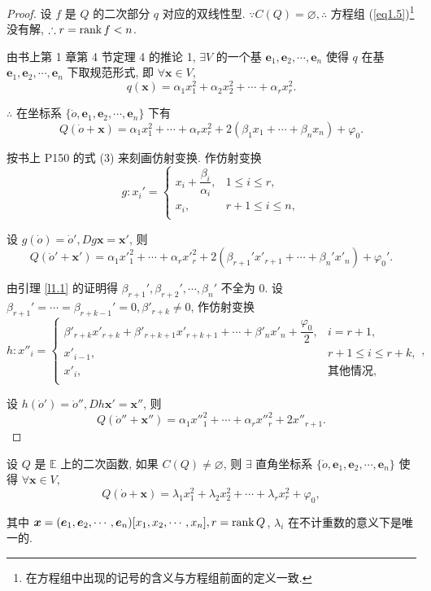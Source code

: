 \documentclass[color=black,device=normal,lang=cn,mode=geye]{elegantnote}
\begin{document}
\begin{proof}
    设 $f$ 是 $Q$ 的二次部分 $q$ 对应的双线性型. $\because C(Q)=\varnothing,\therefore$ 方程组 (\ref{eq1.5})\footnote{在方程组中出现的记号的含义与方程组前面的定义一致.} 没有解, $\therefore r=\operatorname{rank} f<n$.

    由书上第 1 章第 4 节定理 4 的推论 1, $\exists V$ 的一个基 $\boldsymbol{e}_1,\boldsymbol{e}_2,\cdots,\boldsymbol{e}_n$ 使得 $q$ 在基 $\boldsymbol{e}_1,\boldsymbol{e}_2,\cdots,\boldsymbol{e}_n$ 下取规范形式, 即 $\forall\boldsymbol{x}\in V$,
    \[q(\boldsymbol{x})=\alpha_1x^2_1+\alpha_2x^2_2+\cdots+\alpha_rx^2_r.\]

    $\therefore$ 在坐标系 $\{\dot{o},\boldsymbol{e}_1,\boldsymbol{e}_2,\cdots,\boldsymbol{e}_n\}$ 下有
    \[Q(\dot{o}+\boldsymbol{x})=\alpha_1x^2_1+\cdots+\alpha_rx^2_r+2(\beta_1x_1+\cdots+\beta_nx_n)+\varphi_0.\]

    按书上 P150 的式 (3) 来刻画仿射变换. 作仿射变换
    \[g:x_i'=\begin{cases}
        x_i+\dfrac{\beta_i}{\alpha_i}, & 1\leq i\leq r, \\
        x_i, & r+1\leq i\leq n, \\
    \end{cases}\]

    设 $g(\dot{o})=\dot{o}',Dg\boldsymbol{x}=\boldsymbol{x}'$, 则
    \[Q(\dot{o}'+\boldsymbol{x}')=\alpha_1x'^2_1+\cdots+\alpha_rx'^2_r+2(\beta_{r+1}'x'_{r+1}+\cdots+\beta_n'x'_n)+\varphi_0'.\]

    由引理 \ref{l1.1} 的证明得 $\beta_{r+1}',\beta_{r+2}',\cdots,\beta_n'$ 不全为 $0$. 设 $\beta_{r+1}'=\cdots=\beta_{r+k-1}'=0,\beta'_{r+k}\neq0$, 作仿射变换
    \[h:x''_i=\begin{cases}
        \beta'_{r+k}x'_{r+k}+\beta'_{r+k+1}x'_{r+k+1}+\cdots+\beta'_nx'_n+\dfrac{\varphi_0}{2}, & i=r+1, \\
        x'_{i-1}, & r+1\leq i\leq r+k, \\
        x'_i, & \text{其他情况}, \\
    \end{cases},\]

    设 $h(\dot{o}')=\dot{o}'',Dh\boldsymbol{x}'=\boldsymbol{x}''$, 则
    \[Q(\dot{o}''+\boldsymbol{x}'')=\alpha_1x''^2_1+\cdots+\alpha_rx''^2_r+2x''_{r+1}.\]
\end{proof}
\begin{theorem}
    设 $Q$ 是 $\mathbb{E}$ 上的二次函数, 如果 $C(Q)\neq\varnothing$, 则 $\exists$ 直角坐标系 $\{\dot{o},\boldsymbol{e}_1,\boldsymbol{e}_2,\cdots,\boldsymbol{e}_n\}$ 使得 $\forall\boldsymbol{x}\in V$,
    \[Q(\dot{o}+\boldsymbol{x})=\lambda_1x^2_1+\lambda_2x^2_2+\cdots+\lambda_rx^2_r+\varphi_0,\]

    其中 $\boldsymbol{x}=(\boldsymbol{e}_1,\boldsymbol{e}_2,\cdots,\boldsymbol{e}_n)[x_1,x_2,\cdots,x_n],r=\operatorname{rank} Q$, $\lambda_i$ 在不计重数的意义下是唯一的.
\end{theorem}
\end{document}
